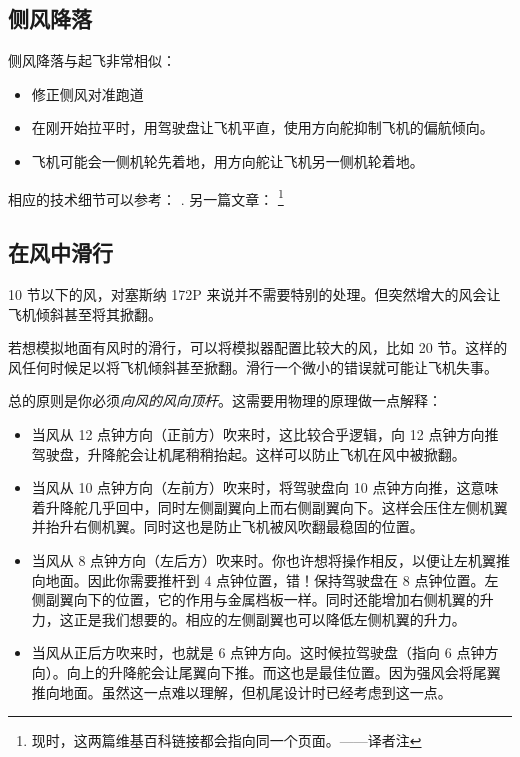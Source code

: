 \subsection{侧风降落}
\label{sec:Lwsw}

侧风降落与起飞非常相似：

\begin{itemize}
    \item 修正侧风对准跑道
    \item 在刚开始拉平时，用驾驶盘让飞机平直，使用方向舵抑制飞机的偏航倾向。
    \item 飞机可能会一侧机轮先着地，用方向舵让飞机另一侧机轮着地。
\end{itemize}

相应的技术细节可以参考：
.
另一篇文章：
\footnote{现时，这两篇维基百科链接都会指向同一个页面。——译者注}

\subsection{在风中滑行}
\label{sec:Twsw}

10 节以下的风，对塞斯纳 172P 来说并不需要特别的处理。但突然增大的风会让飞机倾斜甚至将其掀翻。

若想模拟地面有风时的滑行，可以将模拟器配置比较大的风，比如 20 节。这样的风任何时候足以将飞机倾斜甚至掀翻。滑行一个微小的错误就可能让飞机失事。

总的原则是你必须\emph{向风的风向顶杆}。这需要用物理的原理做一点解释：

\begin{itemize}
    \item 当风从 12 点钟方向（正前方）吹来时，这比较合乎逻辑，向 12 点钟方向推驾驶盘，升降舵会让机尾稍稍抬起。这样可以防止飞机在风中被掀翻。
    \item 当风从 10 点钟方向（左前方）吹来时，将驾驶盘向 10 点钟方向推，这意味着升降舵几乎回中，同时左侧副翼向上而右侧副翼向下。这样会压住左侧机翼并抬升右侧机翼。同时这也是防止飞机被风吹翻最稳固的位置。
    \item 当风从 8 点钟方向（左后方）吹来时。你也许想将操作相反，以便让左机翼推向地面。因此你需要推杆到 4 点钟位置，错！保持驾驶盘在 8 点钟位置。左侧副翼向下的位置，它的作用与金属档板一样。同时还能增加右侧机翼的升力，这正是我们想要的。相应的左侧副翼也可以降低左侧机翼的升力。
    \item 当风从正后方吹来时，也就是 6 点钟方向。这时候拉驾驶盘（指向 6 点钟方向）。向上的升降舵会让尾翼向下推。而这也是最佳位置。因为强风会将尾翼推向地面。虽然这一点难以理解，但机尾设计时已经考虑到这一点。
\end{itemize}

